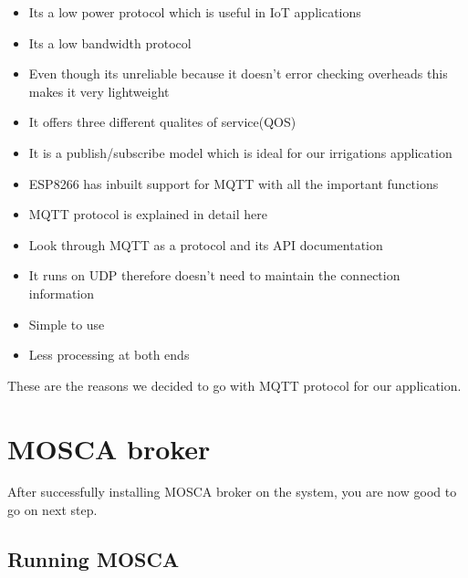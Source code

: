 \documentclass[16pt]{article}
\begin{document}
\begin{itemize}

\item
  Its a low power protocol which is useful in IoT applications
\item
  Its a low bandwidth protocol
\item
  Even though its unreliable because it doesn't error checking overheads
  this makes it very lightweight
\item
  It offers three different qualites of service(QOS)
\item
  It is a publish/subscribe model which is ideal for our irrigations
  application
\item
  ESP8266 has inbuilt support for MQTT with all the important functions
\item
  MQTT protocol is explained in detail here
\item
  Look through MQTT as a protocol and its API documentation
\item
  It runs on UDP therefore doesn't need to maintain the connection
  information
\item
  Simple to use
\item
  Less processing at both ends
\end{itemize}

These are the reasons we decided to go with MQTT protocol for our
application.

\vspace{13cm}

\section{MOSCA broker}

\vspace{0.5cm}

After successfully installing MOSCA broker on the system, you are now
good to go on next step.

\vspace{0.5cm}
\subsection{Running MOSCA}

\vspace{0.3cm}

\end{document}

